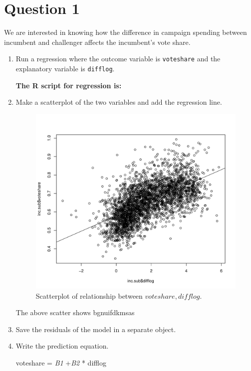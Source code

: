 \documentclass[12pt,letterpaper]{article}
\begin{document}
\section*{Question 1}
\vspace{.25cm}
\noindent We are interested in knowing how the difference in campaign spending between incumbent and challenger affects the incumbent's vote share. 
	\begin{enumerate}
		\item Run a regression where the outcome variable is \texttt{voteshare} and the explanatory variable is \texttt{difflog}.
		
\textbf{		The R script for regression is:}
		  
		
		
		\item Make a scatterplot of the two variables and add the regression line. 
		
		  
		
		
		\begin{figure}[h!]\centering	\caption{\footnotesize Scatterplot of relationship between $voteshare, difflog$.}	
		
		\includegraphics[width=.85\textwidth]{plot1.pdf}
		
		\end{figure}
		
		The above scatter shows bgnuifdkmsas
		
		\vspace*{2cm}
		
		\item Save the residuals of the model in a separate object.			
		
		
		\item Write the prediction equation.
		
		voteshare = \textit{B1} +\textit{B2} * difflog 
	\end{enumerate}
	
\end{document}
